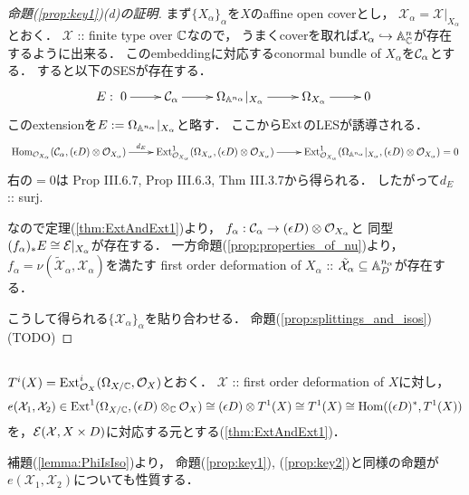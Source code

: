 \documentclass[a4paper]{jsarticle}
\newcommand{\defX}{\mathcal{X}}
\begin{document}
    \begin{proof}[命題(\ref{prop:key1})(d)の証明]
        まず$\{X_{\alpha}\}_{\alpha}$を$X$のaffine open coverとし，
        $\defX_{\alpha}=\defX|_{X_{\alpha}}$とおく．
        $\defX$ :: finite type over $\mathbb{C}$なので，
        うまくcoverを取れば$\defX_{\alpha} \inclmap \affine^{n}_{\C}$が存在するように出来る．
        このembeddingに対応するconormal bundle of $X_{\alpha}$を$\mathcal{C}_{\alpha}$とする．
        すると以下のSESが存在する．
        \[
            E:
        \xymatrix{
            0 \ar[r]& \shC_{\alpha} \ar[r]& \shDer_{\affine^{n_{\alpha}}}|_{X_{\alpha}} \ar[r]& 
            \shDer_{X_{\alpha}} \ar[r]& 0
        }\]
        このextensionを$E:=\Omega_{\mathbb{A}^{n_{\alpha}}}|_{X_{\alpha}}$と略す．
        ここから$\operatorname{Ext}$のLESが誘導される．
        \[\xymatrix{
            \Hom_{\shO_{X_{\alpha}}}(\shC_{\alpha}, (\epsilon D) \otimes \shO_{X_{\alpha}})
            \ar[r]^-{d_{E}}&
            \Ext^1_{\shO_{X_{\alpha}}}(\shDer_{X_{\alpha}}, (\epsilon D) \otimes \shO_{X_{\alpha}})
            \ar[r]&
            \Ext^1_{\shO_{X_{\alpha}}}(\shDer_{\affine^{n_{\alpha}}}|_{X_{\alpha}},
                (\epsilon D) \otimes \shO_{X_{\alpha}})
            =0
        }\]
        右の$=0$は\cite{HarAG} Prop III.6.7, Prop III.6.3, Thm III.3.7から得られる．
        したがって$d_{E}$ :: surj.
        
        なので定理(\ref{thm:ExtAndExt1})より，
        $f_{\alpha}: \mathcal{C}_{\alpha} \to (\epsilon D) \otimes \mathcal{O}_{X_{\alpha}}$と
        同型$(f_{\alpha})_*E \cong \mathcal{E}|_{X_{\alpha}}$が存在する．
        一方命題(\ref{prop:properties_of_nu})より，
        $f_{\alpha}=\nu(\tilde{\defX}_{\alpha}, \defX_{\alpha})$を満たす
        first order deformation of $X_{\alpha}$
        :: $\tilde{\defX}_{\alpha} \subseteq \affine^{n_{\alpha}}_D$が存在する．
        
        こうして得られる$\{\defX_{\alpha}\}_{\alpha}$を貼り合わせる．
        命題(\ref{prop:splittings_and_isos})
        (TODO)
    \end{proof}

    \subsection{\tp{$e(\defX_1, \defX_2)$}{e(X1,X2)}}
    \begin{Def}
        $T^i(X)=\operatorname{Ext}^i_{\mathcal{O}_X}(\Omega_{X/\mathbb{C}}, \mathcal{O}_X)$とおく．
        $\defX$ :: first order deformation of $X$に対し，
        \[
            e(\defX_1, \defX_2)
                \in
                \Ext^1(\shDer_{X/\C}, (\epsilon D) \otimes_{\C} \shO_X)
                \iso (\epsilon D) \otimes T^1(X)
                \iso T^1(X)
                \iso \Hom((\epsilon D)^*, T^1(X))
        \]
        を，$\shE(\defX, X \times D)$に対応する元とする(\ref{thm:ExtAndExt1})．
    \end{Def}
    補題(\ref{lemma:PhiIsIso})より，
    命題(\ref{prop:key1}), (\ref{prop:key2})と同様の命題が
    $e(\defX_1, \defX_2)$についても性質する．
\end{document}
